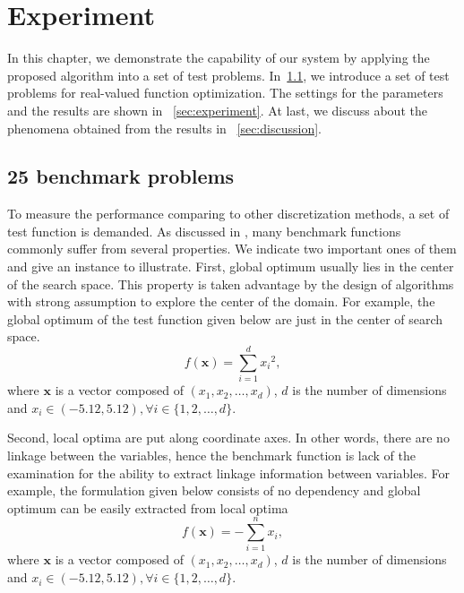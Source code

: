 \chapter{Experiment}
\label{ch:experiment}

In this chapter, we demonstrate the capability of our system by applying the
proposed algorithm into a set of test problems. In~\ref{sec:test problem}, we introduce a set of test problems for real-valued function optimization. The settings for the parameters and the results are shown in ~\ref{sec:experiment}. At last, we discuss about the phenomena obtained from the results in ~\ref{sec:discussion}.


\section{25 benchmark problems}
\label{sec:test problem}
To measure the performance comparing to other discretization methods, a set of
test function is demanded. As discussed in %
, many benchmark functions commonly suffer from several properties. We indicate
two important ones of them and give an instance to illustrate. First, global
optimum usually lies in the center of the search space. This property is taken
advantage by the design of algorithms with strong assumption to explore the
center of the domain. For example, the global
optimum of the test function given below are just in the center of search space. 
\[f(\mathbf{x}) = \sum\limits_{i=1}^d{x_i}^2,\]
where $\mathbf{x}$ is a vector composed of $(x_1, x_2,\ldots, x_d)$, $d$ is the
number of dimensions and $x_i \in (-5.12,5.12),\forall i \in \{1,2,\ldots,d\}$.

Second, local optima are
put along coordinate axes. In other words, there are no linkage between the
variables, hence the benchmark function is lack of the examination for  the ability to extract
linkage information between variables. For example, the formulation given below
consists of no dependency and global optimum can be easily extracted from local
optima
\[f(\mathbf{x}) = -\sum\limits_{i=1}^n{x_i},\]
where $\mathbf{x}$ is a vector composed of $(x_1, x_2,\ldots, x_d)$, $d$ is the
number of dimensions and $x_i \in (-5.12,5.12),\forall i \in \{1,2,\ldots,d\}$.

